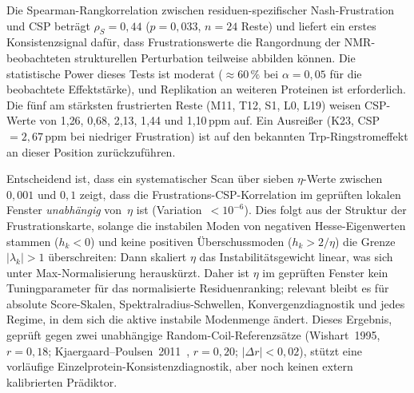 \documentclass[12pt,a4paper]{article}
\theoremstyle{remark}
\begin{document}
Die Spearman-Rangkorrelation zwischen residuen-spezifischer Nash-Frustration und CSP beträgt $\rho_S = 0{,}44$ ($p = 0{,}033$, $n = 24$ Reste) und liefert ein erstes Konsistenzsignal dafür, dass Frustrationswerte die Rangordnung der NMR-beobachteten strukturellen Perturbation teilweise abbilden können. Die statistische Power dieses Tests ist moderat ($\approx 60\,\%$ bei $\alpha = 0{,}05$ für die beobachtete Effektstärke), und Replikation an weiteren Proteinen ist erforderlich. Die fünf am stärksten frustrierten Reste (M11, T12, S1, L0, L19) weisen CSP-Werte von 1{,}26, 0{,}68, 2{,}13, 1{,}44 und 1{,}10\,ppm auf. Ein Ausreißer (K23, CSP~$= 2{,}67$\,ppm bei niedriger Frustration) ist auf den bekannten Trp-Ringstromeffekt an dieser Position zurückzuführen.

Entscheidend ist, dass ein systematischer Scan über sieben $\eta$-Werte zwischen $0{,}001$ und $0{,}1$ zeigt, dass die Frustrations-CSP-Korrelation im geprüften lokalen Fenster \emph{unabhängig} von~$\eta$ ist (Variation~$< 10^{-6}$). Dies folgt aus der Struktur der Frustrationskarte, solange die instabilen Moden von negativen Hesse-Eigenwerten stammen ($h_k<0$) und keine positiven Überschussmoden ($h_k>2/\eta$) die Grenze $|\lambda_k|>1$ überschreiten: Dann skaliert $\eta$ das Instabilitätsgewicht linear, was sich unter Max-Normalisierung herauskürzt. Daher ist $\eta$ im geprüften Fenster kein Tuningparameter für das normalisierte Residuenranking; relevant bleibt es für absolute Score-Skalen, Spektralradius-Schwellen, Konvergenzdiagnostik und jedes Regime, in dem sich die aktive instabile Modenmenge ändert. Dieses Ergebnis, geprüft gegen zwei unabhängige Random-Coil-Referenzsätze (Wishart~1995, $r = 0{,}18$; Kjaergaard--Poulsen~2011~\cite{KjaergaardPoulsen2011}, $r = 0{,}20$; $|\Delta r| < 0{,}02$), stützt eine vorläufige Einzelprotein-Konsistenzdiagnostik, aber noch keinen extern kalibrierten Prädiktor.
\end{document}
